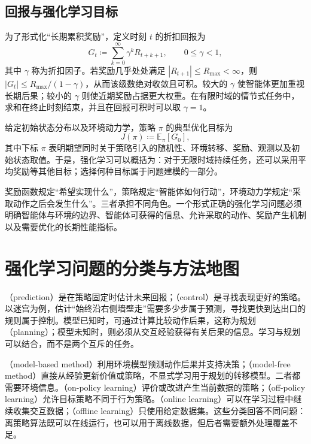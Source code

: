 \documentclass[UTF8,12pt,a4paper,fontset=fandol]{ctexbook}
\begin{document}
\subsection{回报与强化学习目标}


为了形式化“长期累积奖励”，定义时刻 $t$ 的折扣回报为
\begin{equation}
  G_t
  \coloneqq
  \sum_{k=0}^{\infty}\gamma^k R_{t+k+1},
  \qquad 0\leq \gamma<1,
  \label{eq:discounted-return}
\end{equation}
其中 $\gamma$ 称为折扣因子。若奖励几乎处处满足 $|R_{t+1}|\leq R_{\max}<\infty$，则 $|G_t|\leq R_{\max}/(1-\gamma)$，从而该级数绝对收敛且可积。较大的 $\gamma$ 使智能体更加重视长期后果；较小的 $\gamma$ 则使近期奖励占据更大权重。在有限时域的情节式任务中，求和在终止时刻结束，并且在回报可积时可以取 $\gamma=1$。


给定初始状态分布以及环境动力学，策略 $\pi$ 的典型优化目标为
\begin{equation}
  J(\pi)
  \coloneqq
  \mathbb{E}_{\pi}\!\left[G_0\right],
  \label{eq:rl-objective}
\end{equation}
其中下标 $\pi$ 表明期望同时关于策略引入的随机性、环境转移、奖励、观测以及初始状态取值。于是，强化学习可以概括为：对于无限时域持续任务，还可以采用平均奖励等其他目标；选择何种目标属于问题建模的一部分。


\begin{remark}
奖励函数规定“希望实现什么”，策略规定“智能体如何行动”，环境动力学规定“采取动作之后会发生什么”。三者承担不同角色。一个形式正确的强化学习问题必须明确智能体与环境的边界、智能体可获得的信息、允许采取的动作、奖励产生机制以及需要优化的长期性能指标。
\end{remark}


\section{强化学习问题的分类与方法地图}

（prediction）是在策略固定时估计未来回报；（control）是寻找表现更好的策略。以迷宫为例，估计“始终沿右侧墙壁走”需要多少步属于预测，寻找更快到达出口的规则属于控制。模型已知时，可通过计算比较动作后果，这称为规划（planning）；模型未知时，则必须从交互经验获得有关后果的信息。学习与规划可以结合，而不是两个互斥的任务。

（model-based method）利用环境模型预测动作后果并支持决策；（model-free method）直接从经验更新价值或策略，不显式学习用于规划的转移模型。二者都需要环境信息。（on-policy learning）评价或改进产生当前数据的策略；（off-policy learning）允许目标策略不同于行为策略。（online learning）可以在学习过程中继续收集交互数据；（offline learning）只使用给定数据集。这些分类回答不同问题：离策略算法既可以在线运行，也可以用于离线数据，但后者需要额外处理覆盖不足。
\end{document}

